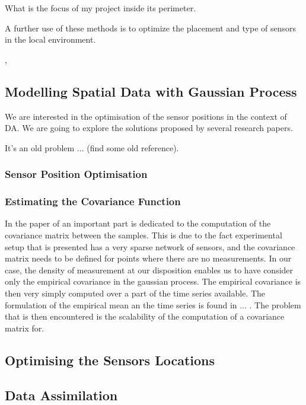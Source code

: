 \documentclass[11pt,a4paper]{article}
\numberwithin{equation}{section}
\begin{document}
What is the focus of my project inside its perimeter. 

A further use of these methods is to optimize the placement and type of sensors in the local environment. 

\cite{song_natural_2018}, 


\subsection{Modelling Spatial Data with Gaussian Process}

We are interested in the optimisation of the sensor positions in the context of DA. We are going to explore the solutions proposed by several research papers. 

It's an old problem ... (find some old reference).   

\subsubsection{Sensor Position Optimisation}

\subsubsection{Estimating the Covariance Function}
In the paper of \citep*{krause_near-optimal_2008} an important part is dedicated to the computation of the covariance matrix between the samples. This is due to the fact experimental setup that is presented has a very sparse network of sensors, and the covariance matrix needs to be defined for points where there are no measurements. In our case, the density of measurement at our disposition enables us to have consider only the empirical covariance in the gaussian process. 
The empirical covariance is then very simply computed over a part of the time series available. The formulation of the empirical mean an the time series is found in ... . 
The problem that is then encountered is the scalability of the computation of a covariance matrix for. 



\subsection{Optimising the Sensors Locations}

\subsection{Data Assimilation}
\end{document}
